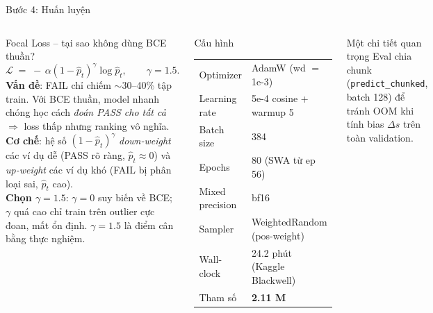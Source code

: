 \documentclass[aspectratio=169,10pt]{beamer}
\begin{document}
\begin{frame}{Bước 4: Huấn luyện}
\begin{columns}[T]
\begin{block}{Focal Loss -- tại sao không dùng BCE thuần?}
\scriptsize
\[
\mathcal{L} \;=\; -\,\alpha (1 - \hat{p}_t)^\gamma \log \hat{p}_t, \qquad \gamma = 1.5.
\]
\textbf{Vấn đề}: FAIL chỉ chiếm $\sim$30--40\% tập train. Với BCE thuần, model nhanh chóng học cách \emph{đoán PASS cho tất cả} $\Rightarrow$ loss thấp nhưng ranking vô nghĩa.\\[2pt]
\textbf{Cơ chế}: hệ số $(1-\hat{p}_t)^\gamma$ \emph{down-weight} các ví dụ dễ (PASS rõ ràng, $\hat{p}_t \approx 0$) và \emph{up-weight} các ví dụ khó (FAIL bị phân loại sai, $\hat{p}_t$ cao).\\[2pt]
\textbf{Chọn $\gamma = 1.5$}: $\gamma = 0$ suy biến về BCE; $\gamma$ quá cao chỉ train trên outlier cực đoan, mất ổn định. $\gamma = 1.5$ là điểm cân bằng thực nghiệm.
\end{block}

\begin{block}{Cấu hình}
\scriptsize
\begin{tabular}{l l}
Optimizer       & AdamW (wd $=$ 1e-3)            \\
Learning rate   & 5e-4 cosine + warmup 5         \\
Batch size      & 384                            \\
Epochs          & 80 (SWA từ ep 56)              \\
Mixed precision & bf16                           \\
Sampler         & WeightedRandom (pos-weight)    \\
Wall-clock      & 24.2 phút (Kaggle Blackwell)   \\
Tham số         & \textbf{2.11 M}                \\
\end{tabular}
\end{block}

\begin{exampleblock}{Một chi tiết quan trọng}
\scriptsize
Eval chia chunk (\texttt{predict\_chunked}, batch 128) để tránh OOM khi tính bias $\Delta s$ trên toàn validation.
\end{exampleblock}
\end{columns}
\end{frame}
\end{document}
